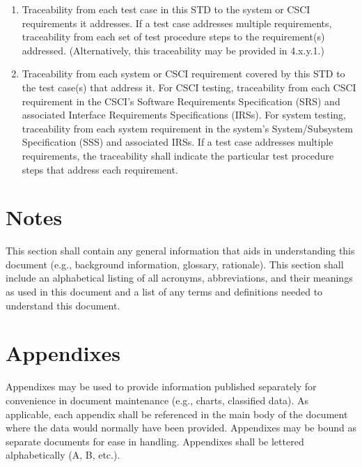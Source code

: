 \begin{enumerate}
\itemsep1pt\parskip0pt
\item
  Traceability from each test case in this STD to the system or CSCI
  requirements it addresses. If a test case addresses multiple
  requirements, traceability from each set of test procedure steps to
  the requirement(s) addressed. (Alternatively, this traceability may be
  provided in 4.x.y.1.)
\item
  Traceability from each system or CSCI requirement covered by this STD
  to the test case(s) that address it. For CSCI testing, traceability
  from each CSCI requirement in the CSCI's Software Requirements
  Specification (SRS) and associated Interface Requirements
  Specifications (IRSs). For system testing, traceability from each
  system requirement in the system's System/Subsystem Specification
  (SSS) and associated IRSs. If a test case addresses multiple
  requirements, the traceability shall indicate the particular test
  procedure steps that address each requirement.
\end{enumerate}

\section{Notes}

This section shall contain any general information that aids in
understanding this document (e.g., background information, glossary,
rationale). This section shall include an alphabetical listing of all
acronyms, abbreviations, and their meanings as used in this document and
a list of any terms and definitions needed to understand this document.

\appendix

\section{Appendixes}

Appendixes may be used to provide information published separately for
convenience in document maintenance (e.g., charts, classified data). As
applicable, each appendix shall be referenced in the main body of the
document where the data would normally have been provided. Appendixes
may be bound as separate documents for ease in handling. Appendixes
shall be lettered alphabetically (A, B, etc.).
